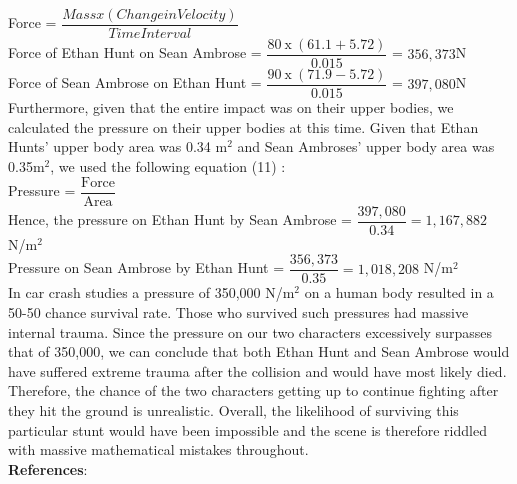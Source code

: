 \documentclass{article}
\begin{document}
Force = $\dfrac{Mass x (Change in Velocity)}{Time Interval}$\\

Force of Ethan Hunt on Sean Ambrose = $ \dfrac{80~ \text{x} ~(61.1 + 5.72)}{0.015}$ = $356,373$N\\

Force of Sean Ambrose on Ethan Hunt = $ \dfrac{90~ \text{x} ~(71.9 - 5.72)}{0.015}$ = $397,080$N\\[6pt]
Furthermore, given that the entire impact was on their upper bodies, we calculated the pressure on their upper bodies at this time. Given that Ethan Hunts' upper body area was 0.34 m$^2$ and Sean Ambroses' upper body area was 0.35m$^2$, we used the following equation (11) :\\[6pt]
Pressure = $\dfrac{\text{Force}}{\text{Area}}$\\[5pt]
Hence, the pressure on Ethan Hunt by Sean Ambrose = $\dfrac{397,080}{0.34} = 1,167,882$ N/m$^2$\\[5pt]
Pressure on Sean Ambrose by Ethan Hunt = $\dfrac{356,373}{0.35} = 1,018,208$ N/m$^2$\\ [5pt]
In car crash studies a pressure of 350,000 N/m$^2$ on a human body resulted in a 50-50 chance survival rate. Those who survived such pressures had massive internal trauma. Since the pressure on our two characters excessively surpasses that of 350,000, we can conclude that both Ethan Hunt and Sean Ambrose would have suffered extreme trauma after the collision and would have most likely died. Therefore, the chance of the two characters getting up to continue fighting after they hit the ground is unrealistic. Overall, the likelihood of surviving this particular stunt would have been impossible and the scene is therefore riddled with massive mathematical mistakes throughout. 
\vspace{5mm}\\
 \textbf{References}:\\
 
\end{document}
